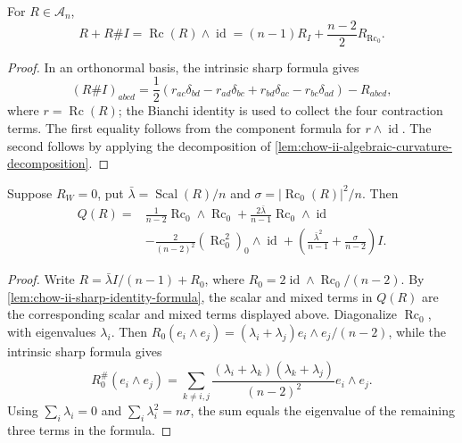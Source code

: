 \begin{lemma}
  \label{lem:chow-ii-sharp-identity-formula}
  For \(R\in\mathcal A_n\),
  \[
    R+R\#I=\operatorname{Rc}(R)\wedge\operatorname{id}
      =(n-1)R_I+\frac{n-2}{2}R_{\operatorname{Rc}_0}.
  \]
\end{lemma}
\begin{proof}
  In an orthonormal basis, the intrinsic sharp formula gives
  \[
  (R\#I)_{abcd}=\frac12(r_{ac}\delta_{bd}-r_{ad}\delta_{bc}
    +r_{bd}\delta_{ac}-r_{bc}\delta_{ad})-R_{abcd},
  \]
  where \(r=\operatorname{Rc}(R)\); the Bianchi identity is used to collect
  the four contraction terms.  The first equality follows from the component
  formula for \(r\wedge\operatorname{id}\).  The second follows by applying
  the decomposition of \ref{lem:chow-ii-algebraic-curvature-decomposition}.
\end{proof}

\begin{lemma}
  \label{lem:chow-ii-quadratic-zero-weyl}
  Suppose \(R_W=0\), put
  \(\bar\lambda=\operatorname{Scal}(R)/n\) and
  \(\sigma=|\operatorname{Rc}_0(R)|^2/n\).  Then
  \[
  \begin{aligned}
  Q(R)={}&\frac1{n-2}\operatorname{Rc}_0\wedge\operatorname{Rc}_0
   +\frac{2\bar\lambda}{n-1}\operatorname{Rc}_0\wedge\operatorname{id}\\
   &-\frac2{(n-2)^2}(\operatorname{Rc}_0^2)_0\wedge\operatorname{id}
   +\left(\frac{\bar\lambda^2}{n-1}+\frac\sigma{n-2}\right)I.
  \end{aligned}
  \]
\end{lemma}
\begin{proof}
  Write \(R=\bar\lambda I/(n-1)+R_0\), where
  \(R_0=2\operatorname{id}\wedge\operatorname{Rc}_0/(n-2)\).  By
  \ref{lem:chow-ii-sharp-identity-formula}, the scalar and mixed terms in
  \(Q(R)\) are the corresponding scalar and mixed terms displayed above.
  Diagonalize \(\operatorname{Rc}_0\), with eigenvalues \(\lambda_i\).  Then
  \(R_0(e_i\wedge e_j)=(\lambda_i+\lambda_j)e_i\wedge e_j/(n-2)\), while the
  intrinsic sharp formula gives
  \[
  R_0^\#(e_i\wedge e_j)=\sum_{k\ne i,j}
    \frac{(\lambda_i+\lambda_k)(\lambda_k+\lambda_j)}{(n-2)^2}
      e_i\wedge e_j.
  \]
  Using \(\sum_i\lambda_i=0\) and \(\sum_i\lambda_i^2=n\sigma\), the sum
  equals the eigenvalue of the remaining three terms in the formula.
\end{proof}

